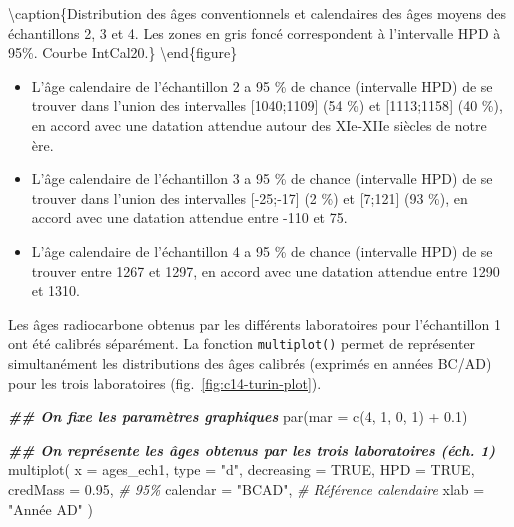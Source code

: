 \documentclass[
  french,
]{scrbook}
\newenvironment{Shaded}{\begin{snugshade}}{\end{snugshade}}
\newcommand{\AttributeTok}[1]{\textcolor[rgb]{0.77,0.63,0.00}{#1}}
\newcommand{\CommentTok}[1]{\textcolor[rgb]{0.56,0.35,0.01}{\textit{#1}}}
\newcommand{\ConstantTok}[1]{\textcolor[rgb]{0.00,0.00,0.00}{#1}}
\newcommand{\DecValTok}[1]{\textcolor[rgb]{0.00,0.00,0.81}{#1}}
\newcommand{\DocumentationTok}[1]{\textcolor[rgb]{0.56,0.35,0.01}{\textbf{\textit{#1}}}}
\newcommand{\FloatTok}[1]{\textcolor[rgb]{0.00,0.00,0.81}{#1}}
\newcommand{\FunctionTok}[1]{\textcolor[rgb]{0.00,0.00,0.00}{#1}}
\newcommand{\NormalTok}[1]{#1}
\newcommand{\SpecialCharTok}[1]{\textcolor[rgb]{0.00,0.00,0.00}{#1}}
\newcommand{\StringTok}[1]{\textcolor[rgb]{0.31,0.60,0.02}{#1}}
\providecommand{\tightlist}{%
  \setlength{\itemsep}{0pt}\setlength{\parskip}{0pt}}
\begin{document}
\textbackslash caption\{Distribution des âges conventionnels et calendaires des âges moyens des échantillons 2, 3 et 4. Les zones en gris foncé correspondent à l'intervalle HPD à 95\%. Courbe IntCal20.\}\label{fig:c14-turin-cal}
\textbackslash end\{figure\}

\begin{itemize}
\tightlist
\item
  L'âge calendaire de l'échantillon 2 a 95 \% de chance (intervalle HPD) de se trouver dans l'union des intervalles {[}1040;1109{]} (54 \%) et {[}1113;1158{]} (40 \%), en accord avec une datation attendue autour des XIe-XIIe siècles de notre ère.
\item
  L'âge calendaire de l'échantillon 3 a 95 \% de chance (intervalle HPD) de se trouver dans l'union des intervalles {[}-25;-17{]} (2 \%) et {[}7;121{]} (93 \%), en accord avec une datation attendue entre -110 et 75.
\item
  L'âge calendaire de l'échantillon 4 a 95 \% de chance (intervalle HPD) de se trouver entre 1267 et 1297, en accord avec une datation attendue entre 1290 et 1310.
\end{itemize}

Les âges radiocarbone obtenus par les différents laboratoires pour l'échantillon 1 ont été calibrés séparément. La fonction \texttt{multiplot()} permet de représenter simultanément les distributions des âges calibrés (exprimés en années BC/AD) pour les trois laboratoires (fig.~\ref{fig:c14-turin-plot}).

\begin{Shaded}
\begin{Highlighting}[]
\DocumentationTok{\#\# On fixe les paramètres graphiques}
\FunctionTok{par}\NormalTok{(}\AttributeTok{mar =} \FunctionTok{c}\NormalTok{(}\DecValTok{4}\NormalTok{, }\DecValTok{1}\NormalTok{, }\DecValTok{0}\NormalTok{, }\DecValTok{1}\NormalTok{) }\SpecialCharTok{+} \FloatTok{0.1}\NormalTok{)}

\DocumentationTok{\#\# On représente les âges obtenus par les trois laboratoires (éch. 1)}
\FunctionTok{multiplot}\NormalTok{(}
  \AttributeTok{x =}\NormalTok{ ages\_ech1,}
  \AttributeTok{type =} \StringTok{"d"}\NormalTok{,}
  \AttributeTok{decreasing =} \ConstantTok{TRUE}\NormalTok{,}
  \AttributeTok{HPD =} \ConstantTok{TRUE}\NormalTok{,}
  \AttributeTok{credMass =} \FloatTok{0.95}\NormalTok{,  }\CommentTok{\# 95\%}
  \AttributeTok{calendar =} \StringTok{"BCAD"}\NormalTok{, }\CommentTok{\# Référence calendaire}
  \AttributeTok{xlab =} \StringTok{"Année AD"}
\NormalTok{)}
\end{Highlighting}
\end{Shaded}
\end{document}
